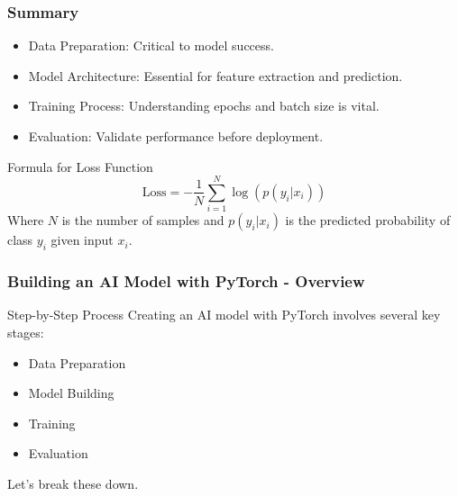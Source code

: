 \documentclass[aspectratio=169]{beamer}
\begin{document}
\begin{frame}[fragile]
    \frametitle{Summary}
    \begin{itemize}
        \item Data Preparation: Critical to model success.
        \item Model Architecture: Essential for feature extraction and prediction.
        \item Training Process: Understanding epochs and batch size is vital.
        \item Evaluation: Validate performance before deployment.
    \end{itemize}
    \begin{block}{Formula for Loss Function}
        \begin{equation}
            \text{Loss} = -\frac{1}{N} \sum_{i=1}^{N} \log(p(y_i | x_i))
        \end{equation}
        Where $N$ is the number of samples and $p(y_i | x_i)$ is the predicted probability of class $y_i$ given input $x_i$.
    \end{block}
\end{frame}

\begin{frame}[fragile]
    \frametitle{Building an AI Model with PyTorch - Overview}
    \begin{block}{Step-by-Step Process}
        Creating an AI model with PyTorch involves several key stages:
        \begin{itemize}
            \item Data Preparation
            \item Model Building
            \item Training
            \item Evaluation
        \end{itemize}
        Let's break these down.
    \end{block}
\end{frame}
\end{document}
